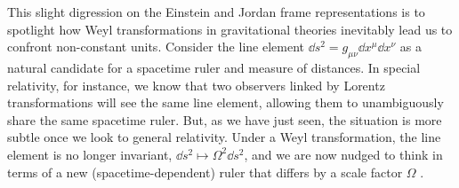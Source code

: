 \documentclass[12pt]{article}
\numberwithin{equation}{section}
\begin{document}
This slight digression on the Einstein and Jordan frame representations is to spotlight how Weyl transformations in gravitational theories inevitably lead us to confront non-constant units. Consider the line element $\dd s^2 = g_{\mu\nu} \dd x^\mu \dd x^\nu$ as a natural candidate for a spacetime ruler and measure of distances. In special relativity, for instance, we know that two observers linked by Lorentz transformations will see the same line element, allowing them to unambiguously share the same spacetime ruler. But, as we have just seen, the situation is more subtle once we look to general relativity. Under a Weyl transformation, the line element is no longer invariant, $\dd s^2\mapsto \Omega^2 \dd s^2$, and we are now nudged to think in terms of a new (spacetime-dependent) ruler that differs by a scale factor $\Omega$ \citep[see also][]{Eddington1921,Eddington1923}.
\end{document}
